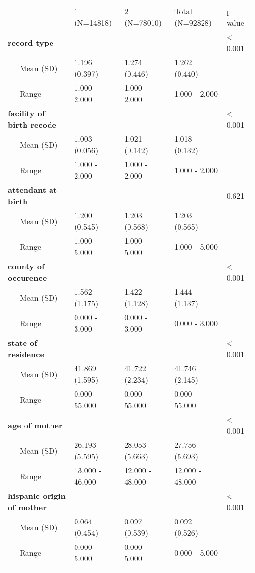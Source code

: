 \begin{longtable}[c]{@{}lllll@{}}
\toprule\addlinespace
& 1 (N=14818) & 2 (N=78010) & Total (N=92828) & p value
\\\addlinespace
\midrule\endhead
\textbf{record type} & & & & \textless{} 0.001
\\\addlinespace
~~~Mean (SD) & 1.196 (0.397) & 1.274 (0.446) & 1.262 (0.440) &
\\\addlinespace
~~~Range & 1.000 - 2.000 & 1.000 - 2.000 & 1.000 - 2.000 &
\\\addlinespace
\textbf{facility of birth recode} & & & & \textless{} 0.001
\\\addlinespace
~~~Mean (SD) & 1.003 (0.056) & 1.021 (0.142) & 1.018 (0.132) &
\\\addlinespace
~~~Range & 1.000 - 2.000 & 1.000 - 2.000 & 1.000 - 2.000 &
\\\addlinespace
\textbf{attendant at birth} & & & & 0.621
\\\addlinespace
~~~Mean (SD) & 1.200 (0.545) & 1.203 (0.568) & 1.203 (0.565) &
\\\addlinespace
~~~Range & 1.000 - 5.000 & 1.000 - 5.000 & 1.000 - 5.000 &
\\\addlinespace
\textbf{county of occurence} & & & & \textless{} 0.001
\\\addlinespace
~~~Mean (SD) & 1.562 (1.175) & 1.422 (1.128) & 1.444 (1.137) &
\\\addlinespace
~~~Range & 0.000 - 3.000 & 0.000 - 3.000 & 0.000 - 3.000 &
\\\addlinespace
\textbf{state of residence} & & & & \textless{} 0.001
\\\addlinespace
~~~Mean (SD) & 41.869 (1.595) & 41.722 (2.234) & 41.746 (2.145) &
\\\addlinespace
~~~Range & 0.000 - 55.000 & 0.000 - 55.000 & 0.000 - 55.000 &
\\\addlinespace
\textbf{age of mother} & & & & \textless{} 0.001
\\\addlinespace
~~~Mean (SD) & 26.193 (5.595) & 28.053 (5.663) & 27.756 (5.693) &
\\\addlinespace
~~~Range & 13.000 - 46.000 & 12.000 - 48.000 & 12.000 - 48.000 &
\\\addlinespace
\textbf{hispanic origin of mother} & & & & \textless{} 0.001
\\\addlinespace
~~~Mean (SD) & 0.064 (0.454) & 0.097 (0.539) & 0.092 (0.526) &
\\\addlinespace
~~~Range & 0.000 - 5.000 & 0.000 - 5.000 & 0.000 - 5.000 &
\\\addlinespace

\end{longtable}
